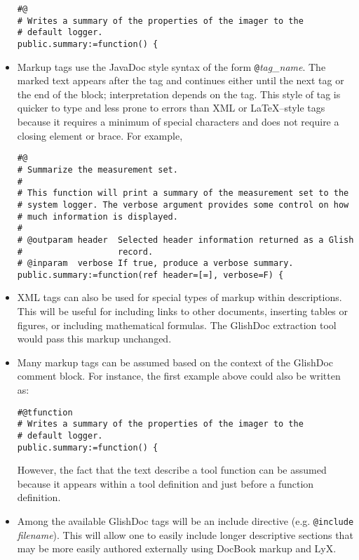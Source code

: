 \begin{itemize}
\goodbreak

\begin{verbatim}
#@
# Writes a summary of the properties of the imager to the
# default logger.
public.summary:=function() {
\end{verbatim}

\item Markup tags use the JavaDoc style syntax of the form
\verb|@|{\it tag\_name}.  The marked text appears after the tag and
continues either until the next tag or the end of the block;
interpretation depends on the tag.  This style of tag is quicker to
type and less prone to errors than XML or \LaTeX--style tags because
it requires a minimum of special characters and does not require a
closing element or brace.  For example,

\begin{verbatim}
#@
# Summarize the measurement set.
#
# This function will print a summary of the measurement set to the
# system logger. The verbose argument provides some control on how
# much information is displayed.
# 
# @outparam header  Selected header information returned as a Glish 
#                   record.
# @inparam  verbose If true, produce a verbose summary.
public.summary:=function(ref header=[=], verbose=F) {
\end{verbatim}

\item XML tags can also be used for special types of markup within
descriptions.  This will be useful for including links to other
documents, inserting tables or figures, or including mathematical
formulas.  The GlishDoc extraction tool would pass this markup
unchanged. 

\item Many markup tags can be assumed based on the context of the
GlishDoc comment block.  For instance, the first example above could
also be written as: 

\begin{verbatim}
#@tfunction
# Writes a summary of the properties of the imager to the
# default logger.
public.summary:=function() {
\end{verbatim}

However, the fact that the text describe a tool function can be
assumed because it appears within a tool definition and just before a
function definition.  

\item Among the available GlishDoc tags will be an include directive
(e.g. \verb|@include| {\it filename}).  This will allow one to easily
include longer descriptive sections that may be more easily authored
externally using DocBook markup and LyX.


\end{itemize}
